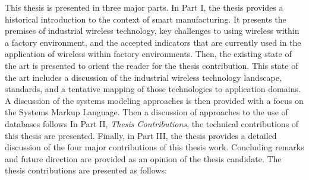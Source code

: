 \documentclass[twocolumn]{IEEEtran}
\begin{document}
		This thesis is presented in three major parts.  In Part I, the thesis provides a historical introduction to the context of smart manufacturing.  It presents the premises of industrial wireless technology, key challenges to using wireless within a factory environment, and the accepted indicators that are currently used in the application of wireless within factory environments. Then, the existing state of the art is presented to orient the reader for the thesis contribution.  This state of the art includes a discussion of the industrial wireless technology landscape, standards, and a tentative mapping of those technologies to application domains.  A discussion of the systems modeling approaches is then provided with a focus on the Systems Markup Language.  Then a discussion of approaches to the use of databases follows   In Part II, \textit{Thesis Contributions}, the technical contributions of this thesis are presented.  Finally, in Part III, the thesis provides a detailed discussion of the four major contributions of this thesis work.  Concluding remarks and future direction are provided as an opinion of the thesis candidate.  The thesis contributions are presented as follows:\vspace{5mm}
		
\end{document}
